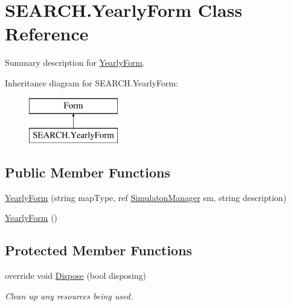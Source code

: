 \hypertarget{class_s_e_a_r_c_h_1_1_yearly_form}{\section{S\-E\-A\-R\-C\-H.\-Yearly\-Form Class Reference}
\label{class_s_e_a_r_c_h_1_1_yearly_form}
}


Summary description for \hyperlink{class_s_e_a_r_c_h_1_1_yearly_form}{Yearly\-Form}.  


Inheritance diagram for S\-E\-A\-R\-C\-H.\-Yearly\-Form\-:\begin{figure}[H]
\begin{center}
\leavevmode
\includegraphics[height=2.000000cm]{class_s_e_a_r_c_h_1_1_yearly_form}
\end{center}
\end{figure}
\subsection*{Public Member Functions}
\begin{DoxyCompactItemize}
\item 
\hyperlink{class_s_e_a_r_c_h_1_1_yearly_form_a600c256152930e0f40466e8ead0b8a97}{Yearly\-Form} (string map\-Type, ref \hyperlink{class_s_e_a_r_c_h_1_1_simulaton_manager}{Simulaton\-Manager} sm, string description)
\item 
\hyperlink{class_s_e_a_r_c_h_1_1_yearly_form_a5d606970f26a32ca26093019aef1694a}{Yearly\-Form} ()
\end{DoxyCompactItemize}
\subsection*{Protected Member Functions}
\begin{DoxyCompactItemize}
\item 
override void \hyperlink{class_s_e_a_r_c_h_1_1_yearly_form_a3749cd62c5716f891f55b7255fee6371}{Dispose} (bool disposing)
\begin{DoxyCompactList}\small\item\em Clean up any resources being used. \end{DoxyCompactList}\end{DoxyCompactItemize}


